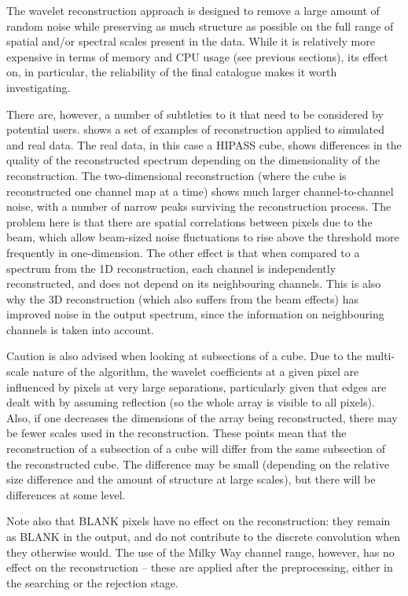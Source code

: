 
The \atrous wavelet reconstruction approach is designed to remove a
large amount of random noise while preserving as much structure as
possible on the full range of spatial and/or spectral scales present
in the data. While it is relatively more expensive in terms of memory
and CPU usage (see previous sections), its effect on, in particular,
the reliability of the final catalogue makes it worth investigating.

There are, however, a number of subtleties to it that need to be
considered by potential users. \citet{whiting12} shows a set of
examples of reconstruction applied to simulated and real data. The
real data, in this case a HIPASS cube, shows differences in the
quality of the reconstructed spectrum depending on the dimensionality
of the reconstruction. The two-dimensional reconstruction (where the
cube is reconstructed one channel map at a time) shows much larger
channel-to-channel noise, with a number of narrow peaks surviving the
reconstruction process. The problem here is that there are spatial
correlations between pixels due to the beam, which allow beam-sized
noise fluctuations to rise above the threshold more frequently in
one-dimension. The other effect is that when compared to a spectrum
from the 1D reconstruction, each channel is independently
reconstructed, and does not depend on its neighbouring channels. This
is also why the 3D reconstruction (which also suffers from the beam
effects) has improved noise in the output spectrum, since the
information on neighbouring channels is taken into account.

Caution is also advised when looking at subsections of a cube. Due to
the multi-scale nature of the algorithm, the wavelet coefficients at a
given pixel are influenced by pixels at very large separations,
particularly given that edges are dealt with by assuming reflection
(so the whole array is visible to all pixels). Also, if one decreases
the dimensions of the array being reconstructed, there may be fewer
scales used in the reconstruction. These points mean that the
reconstruction of a subsection of a cube will differ from the same
subsection of the reconstructed cube. The difference may be small
(depending on the relative size difference and the amount of structure
at large scales), but there will be differences at some level.

Note also that BLANK pixels have no effect on the reconstruction: they
remain as BLANK in the output, and do not contribute to the discrete
convolution when they otherwise would. The use of the Milky Way
channel range, however, has no effect on the reconstruction -- these
are applied after the preprocessing, either in the searching or the
rejection stage.

